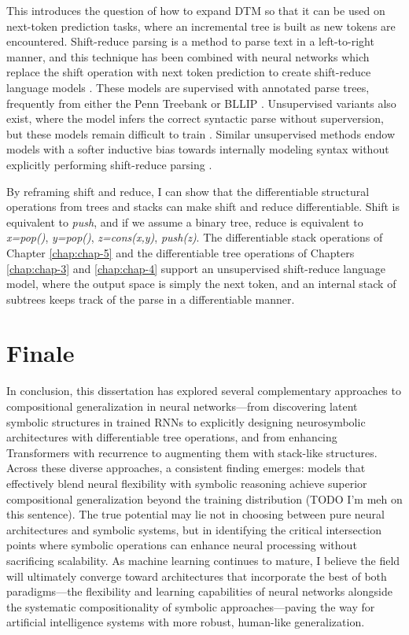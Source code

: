 This introduces the question of how to expand DTM so that it can be used on next-token prediction tasks, where an incremental tree is built as new tokens are encountered. Shift-reduce parsing is a method to parse text in a left-to-right manner, and this technique has been combined with neural networks which replace the shift operation with next token prediction to create shift-reduce language models \citep{dyer_recurrent_2016, choe_parsing_2016, qian_structural_2021}. These models are supervised with annotated parse trees, frequently from either the Penn Treebank \citep{marcus-etal-1993-building} or BLLIP \citep{charniak2000bllip}. Unsupervised variants also exist, where the model infers the correct syntactic parse without superversion, but these models remain difficult to train \citep{kim_unsupervised_2019, buys_neural_2018,hu_generative_2024}. Similar unsupervised methods endow models with a softer inductive bias towards internally modeling syntax without explicitly performing shift-reduce parsing \citep{bowman_fast_2016,shen_ordered_2019,drozdov_unsupervised_2019}.

By reframing shift and reduce, I can show that the differentiable structural operations from trees and stacks can make shift and reduce differentiable. Shift is equivalent to \textit{push}, and if we assume a binary tree, reduce is equivalent to \textit{x=pop()}, \textit{y=pop()}, \textit{z=cons(x,y)}, \textit{push(z)}. The differentiable stack operations of Chapter \ref{chap:chap-5} and the differentiable tree operations of Chapters \ref{chap:chap-3} and \ref{chap:chap-4} support an unsupervised shift-reduce language model, where the output space is simply the next token, and an internal stack of subtrees keeps track of the parse in a differentiable manner.

\section{Finale}
In conclusion, this dissertation has explored several complementary approaches to compositional generalization in neural networks—from discovering latent symbolic structures in trained RNNs to explicitly designing neurosymbolic architectures with differentiable tree operations, and from enhancing Transformers with recurrence to augmenting them with stack-like structures. Across these diverse approaches, a consistent finding emerges: models that effectively blend neural flexibility with symbolic reasoning achieve superior compositional generalization beyond the training distribution (TODO I'm meh on this sentence). The true potential may lie not in choosing between pure neural architectures and symbolic systems, but in identifying the critical intersection points where symbolic operations can enhance neural processing without sacrificing scalability. As machine learning continues to mature, I believe the field will ultimately converge toward architectures that incorporate the best of both paradigms—the flexibility and learning capabilities of neural networks alongside the systematic compositionality of symbolic approaches—paving the way for artificial intelligence systems with more robust, human-like generalization.